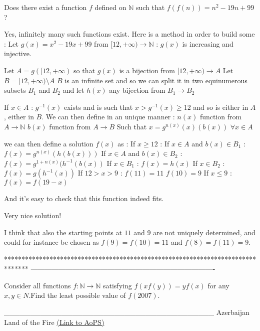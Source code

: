 \begin{solution}
	\begin{tcolorbox}Does there exist a function $f$ defined on $\mathbb{N}$ such that $f(f(n))=n^2-19n+99$ ?\end{tcolorbox}
Yes, infinitely many such functions exist. Here is a method in order to build some :
Let $g(x)=x^2-19x+99$ from $\mathbb [12,+\infty)\to\mathbb N$ : $g(x)$ is increasing and injective.

Let $A=g([12,+\infty)$ so that $g(x)$ is a bijection from $[12,+\infty)\to A$
Let $B=[12,+\infty)\setminus A$
$B$ is an infinite set and so we can split it in two equinumerous subsets $B_1$ and $B_2$ and let $h(x)$ any bijection from $B_1\to B_2$

If $x\in A$ : $g^{-1}(x)$ exists and is such that $x>g^{-1}(x)\ge 12$ and so is either in $A$, either in $B$. We can then define in an unique manner :
$n(x)$ function from $A\to\mathbb N$
$b(x)$ function from $A\to B$
Such that $x=g^{n(x)}(x)(b(x))$ $\forall x\in A$

we can then define a solution $f(x)$ as :
If $x\ge 12$ :
  If $x\in A$ and $b(x)\in B_1$ : $f(x)=g^{n(x)}(h(b(x)))$
  If $x\in A$ and $b(x)\in B_2$ : $f(x)=g^{1+n(x)}(h^{-1}(b(x))$
  If $x\in B_1$ : $f(x)=h(x)$
  If $x\in B_2$ : $f(x)=g(h^{-1}(x))$
If $12>x>9$ :
  $f(11)=11$
  $f(10)=9$
If $x\le 9$ :
  $f(x)=f(19-x)$

And it's easy to check that this function indeed fits.
\end{solution}



\begin{solution}
	Very nice solution!

I think that also the starting points at $11$ and $9$ are not uniquely determined, and could
for instance be chosen as $f(9)=f(10)=11$ and $f(8)=f(11)=9$.
\end{solution}
*******************************************************************************
-------------------------------------------------------------------------------

\begin{problem}
	Consider all functions $f: \mathbb{N}\to\mathbb{N}$ satisfying $f(xf(y))=yf(x)$ for any $x,y{\in}N$.Find the least possible value of $f(2007)$.


________________________________________
Azerbaijan Land of the Fire 
	\flushright \href{https://artofproblemsolving.com/community/c6h531213}{(Link to AoPS)}
\end{problem}



